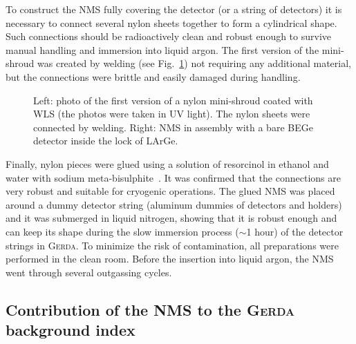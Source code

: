 \documentclass[twocolumn,epjc3]{svjour3}
\newcommand{\Gerda} {{\textsc{Gerda}\xspace}}
\newcommand{\LArGe} {{{LArGe}\xspace}}
\begin{document}
To construct the NMS fully covering the detector (or a string of detectors) it is necessary to connect several nylon sheets together to form a cylindrical shape. Such connections should be radioactively clean and robust enough to survive manual handling and immersion into liquid argon. The first version of the mini-shroud was created by welding (see Fig.~\ref{fig:nylon1}) not requiring any additional material, but the connections were brittle and easily damaged during handling.
%
\begin{figure}
  \begin{center}
    \begin{minipage}{0.49\linewidth}
    \end{minipage}
    \hfill
    \begin{minipage}{0.49\linewidth}
    \end{minipage}
    \caption{\label{fig:nylon1}Left: photo of the first version of a nylon mini-shroud coated with WLS (the photos were taken in UV light). The nylon sheets were connected by welding. Right: NMS in assembly with a bare BEGe detector inside the lock of \LArGe.}
  \end{center}
\end{figure}
%
Finally, nylon pieces were glued using a solution of resorcinol in ethanol and water with sodium meta-bisulphite~\cite{borexino_glue}. It was confirmed that the connections are very robust and suitable for cryogenic operations. The glued NMS was placed around a dummy detector string (aluminum dummies of detectors and holders) and it was submerged in liquid nitrogen, showing that it is robust enough and can keep its shape during the slow immersion process ($\sim$1 hour) of the detector strings in \Gerda{}. To minimize the risk of contamination, all preparations were performed in the clean room. Before the insertion into liquid argon, the NMS went through several outgassing cycles. 

\subsection{Contribution of the NMS to the \Gerda{} background index}
\label{sec:devMS}
\end{document}
